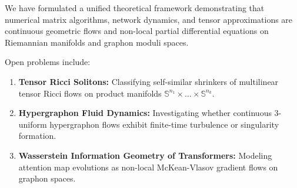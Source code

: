 \documentclass[11pt,a4paper,reqno]{amsart}
\theoremstyle{definition}
\numberwithin{equation}{section}
\providecommand{\Sph}{\mathbb{S}}
\providecommand{\Sph}{\mathbb{S}}
\begin{document}
We have formulated a unified theoretical framework demonstrating that numerical matrix algorithms, network dynamics, and tensor approximations are continuous geometric flows and non-local partial differential equations on Riemannian manifolds and graphon moduli spaces. 

Open problems include:
\begin{enumerate}
    \item \textbf{Tensor Ricci Solitons:} Classifying self-similar shrinkers of multilinear tensor Ricci flows on product manifolds $\Sph^{n_1} \times \dots \times \Sph^{n_k}$.
    \item \textbf{Hypergraphon Fluid Dynamics:} Investigating whether continuous 3-uniform hypergraphon flows exhibit finite-time turbulence or singularity formation.
    \item \textbf{Wasserstein Information Geometry of Transformers:} Modeling attention map evolutions as non-local McKean-Vlasov gradient flows on graphon spaces.
\end{enumerate}
\end{document}
